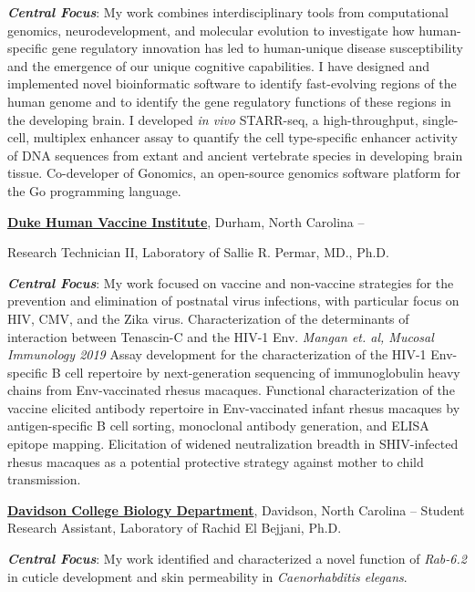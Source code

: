 \documentclass[letterpaper,MMMyyyy,nonstopmode]{simpleresumecv}
\begin{document}
\begin{Body}
\begin{Detail}
\SubBulletItem
\textbf{\textit{Central Focus}}: My work combines interdisciplinary tools from computational genomics, neurodevelopment, and molecular evolution to investigate how human-specific gene regulatory innovation has led to human-unique disease susceptibility and the emergence of our unique cognitive capabilities.
\SubBulletItem
I have designed and implemented novel bioinformatic software to identify fast-evolving regions of the human genome and to identify the gene regulatory functions of these regions in the developing brain.
\SubBulletItem
I developed \textit{in vivo} STARR-seq, a high-throughput, single-cell, multiplex enhancer assay to quantify the cell type-specific enhancer activity of DNA sequences from extant and ancient vertebrate species in developing brain tissue.
\SubBulletItem
Co-developer of Gonomics, an open-source genomics software platform for the Go programming language.
\end{Detail}

\BigGap
\Entry
\href{https://dhvi.duke.edu/}
{\textbf{Duke Human Vaccine Institute}},
Durham, North Carolina \hfill
{} --

\Gap
\BulletItem
Research Technician II, Laboratory of Sallie R. Permar, MD., Ph.D.

\begin{Detail}
\SubBulletItem
\textbf{\textit{Central Focus}}: My work focused on vaccine and non-vaccine strategies for the prevention and elimination of postnatal virus infections, with particular focus on HIV, CMV, and the Zika virus.
\SubBulletItem
Characterization of the determinants of interaction between Tenascin-C and the HIV-1 Env. \textit{Mangan et. al, Mucosal Immunology 2019}
\SubBulletItem
Assay development for the characterization of the HIV-1 Env-specific B cell repertoire by next-generation sequencing of immunoglobulin heavy chains from Env-vaccinated rhesus macaques.
\SubBulletItem
Functional characterization of the vaccine elicited antibody repertoire in Env-vaccinated infant rhesus macaques by antigen-specific B cell sorting, monoclonal antibody generation, and ELISA epitope mapping.
\SubBulletItem
Elicitation of widened neutralization breadth in SHIV-infected rhesus macaques as a potential protective strategy against mother to child transmission. 
\end{Detail}

\BigGap
\Entry
\href{https://www.davidson.edu/academic-departments/biology}
{\textbf{Davidson College Biology Department}},
Davidson, North Carolina \hfill
{} --
\Gap
\BulletItem
Student Research Assistant, Laboratory of Rachid El Bejjani, Ph.D.
\begin{Detail}
\SubBulletItem
\textbf{\textit{Central Focus}}: My work identified and characterized a novel function of \textit{Rab-6.2} in cuticle development and skin permeability in \textit{Caenorhabditis elegans}.
\end{Detail}


\end{Body}
\end{document}
